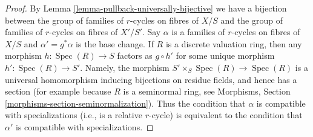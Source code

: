 \documentclass{stacks-project}
\theoremstyle{plain}
\theoremstyle{definition}
\theoremstyle{remark}
\numberwithin{equation}{subsection}
\def\Spec{\mathop{\mathrm{Spec}}}
\begin{document}
\begin{proof}
By Lemma \ref{lemma-pullback-universally-bijective} we have a bijection
between the group of families of $r$-cycles on fibres of $X/S$ and
the group of families of $r$-cycles on fibres of $X'/S'$.
Say $\alpha$ is a families of $r$-cycles on fibres of $X/S$ and
$\alpha' = g^*\alpha$ is the base change.
If $R$ is a discrete valuation ring, then any morphism
$h : \Spec(R) \to S$ factors as $g \circ h'$ for some
unique morphism $h' : \Spec(R) \to S'$.
Namely, the morphism $S' \times_S \Spec(R) \to \Spec(R)$ is
a universal homomorphism inducing bijections on residue fields,
and hence has a section (for example because $R$ is a seminormal
ring, see Morphisms, Section \ref{morphisms-section-seminormalization}).
Thus the condition that $\alpha$ is compatible with
specializations (i.e., is a relative $r$-cycle)
is equivalent to the condition that
$\alpha'$ is compatible with specializations.
\end{proof}
\end{document}
